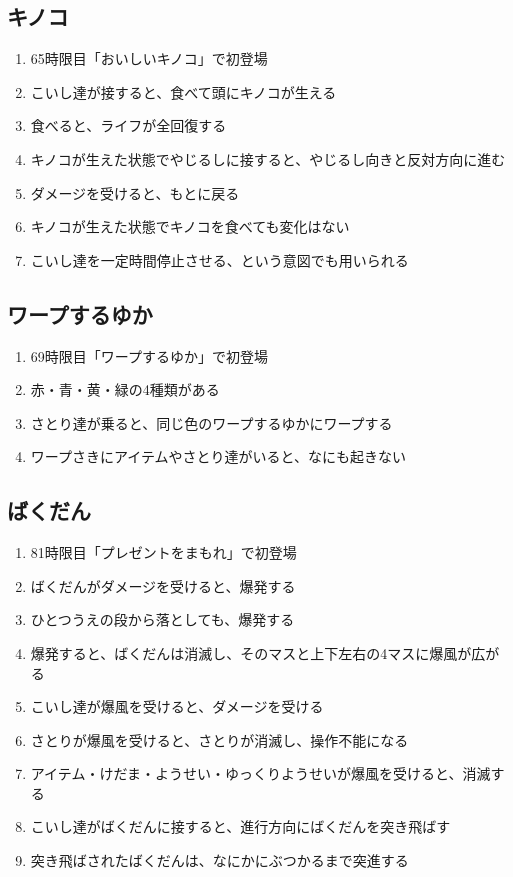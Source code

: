 \subsection{キノコ}
\begin{enumerate}[label={\sarrow}]
\item 65時限目「おいしいキノコ」で初登場
\item こいし達が接すると、食べて頭にキノコが生える
\item 食べると、ライフが全回復する
\item キノコが生えた状態でやじるしに接すると、やじるし向きと反対方向に進む
\item ダメージを受けると、もとに戻る
\item キノコが生えた状態でキノコを食べても変化はない
\item こいし達を一定時間停止させる、という意図でも用いられる
\end{enumerate}


\subsection{ワープするゆか}
\begin{enumerate}[label={\sarrow}]
\item 69時限目「ワープするゆか」で初登場
\item 赤・青・黄・緑の4種類がある
\item さとり達が乗ると、同じ色のワープするゆかにワープする
\item ワープさきにアイテムやさとり達がいると、なにも起きない
\end{enumerate}


\subsection{ばくだん}
\begin{enumerate}[label={\sarrow}]
\item 81時限目「プレゼントをまもれ」で初登場
\item ばくだんがダメージを受けると、爆発する
\item ひとつうえの段から落としても、爆発する
\item 爆発すると、ばくだんは消滅し、そのマスと上下左右の4マスに爆風が広がる
\item こいし達が爆風を受けると、ダメージを受ける
\item さとりが爆風を受けると、さとりが消滅し、操作不能になる
\item アイテム・けだま・ようせい・ゆっくりようせいが爆風を受けると、消滅する
\item こいし達がばくだんに接すると、進行方向にばくだんを突き飛ばす
\item 突き飛ばされたばくだんは、なにかにぶつかるまで突進する
\end{enumerate}


